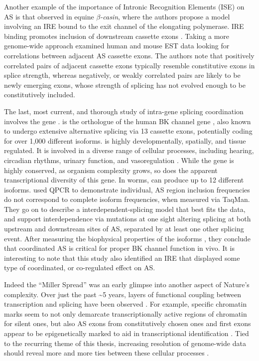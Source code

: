     Another example of the importance of Intronic Recognition Elements (ISE) on AS is that observed in equine \textit{$\beta$-casin}, where the authors propose a model involving an IRE bound to the exit channel of the elongating polymerase. IRE binding promotes inclusion of downstream cassette exons \citep{Lenasi2006}. Taking a more genome-wide approach \citet{Peng2008} examined human and mouse EST data looking for correlations between adjacent AS cassette exons. The authors note that positively correlated pairs of adjacent cassette exons typically resemble constitutive exons in splice strength, whereas negatively, or weakly correlated pairs are likely to be newly emerging exons, whose strength of splicing has not evolved enough to be constitutively included.

    The last, most current, and thorough study of intra-gene splicing coordination involves the \worms{} gene \slo{} \citep{Glauser2011, Johnson2011}. \slo{} is the \worms{} orthologue of the human BK channel gene \kcnma{}, also known to undergo extensive alternative splicing \citep{Nilsen2010} via 13 cassette exons, potentially coding for over 1,000 different isoforms. \kcnma{} is highly developmentally, spatially, and tissue regulated. It is involved in a diverse range of cellular processes, including hearing, circadian rhythms, urinary function, and vasoregulation \citep{Fodor2009a}. While the gene is highly conserved, as organism complexity grows, so does the apparent transcriptional diversity of this gene. In worms, \slo{} can produce up to 12 different isoforms. \citet{Glauser2011} used QPCR to demonstrate individual, AS region inclusion frequencies do not correspond to complete isoform frequencies, when measured via TaqMan. They go on to describe a interdependent-splicing model that best fits the data, and support interdependence via mutations at one sight altering splicing at both upstream and downstream sites of AS, separated by at least one other splicing event. After measuring the biophysical properties of the isoforms \citep{Johnson2011}, they conclude that coordinated AS is critical for proper BK channel function in vivo. It is interesting to note that this study also identified an IRE that displayed some type of coordinated, or co-regulated effect on AS.

    Indeed the ``Miller Spread'' was an early glimpse into another aspect of Nature's complexity. Over just the past \textasciitilde5 years, layers of functional coupling between transcription and splicing have been observed \citep{Merkhofer2014}. For example, specific chromatin marks seem to not only demarcate transcriptionally active regions of chromatin for silent ones, but also AS exons from constitutively chosen ones \citep{Kolasinska-Zwierz2009} and first exons appear to be epigenetically marked to aid in transcriptional identification \citep{Bieberstein2012}. Tied to the recurring theme of this thesis, increasing resolution of genome-wide data should reveal more and more ties between these cellular processes \citep{Schwartz2010,Luco2011a,Brown2012}.

